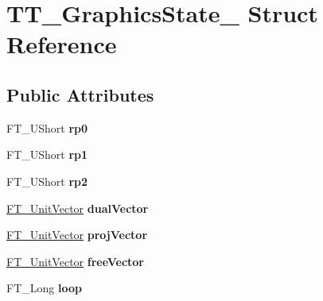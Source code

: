 \hypertarget{struct_t_t___graphics_state__}{}\section{T\+T\+\_\+\+Graphics\+State\+\_\+ Struct Reference}
\label{struct_t_t___graphics_state__}
\subsection*{Public Attributes}
\begin{DoxyCompactItemize}
\item 
\mbox{\label{struct_t_t___graphics_state___a359caf59279b2cc988d44266a3c44b48}} 
F\+T\+\_\+\+U\+Short {\bfseries rp0}
\item 
\mbox{\label{struct_t_t___graphics_state___ade72a46374f8869d16c8f7a8952c1d7f}} 
F\+T\+\_\+\+U\+Short {\bfseries rp1}
\item 
\mbox{\label{struct_t_t___graphics_state___aa93f489406aad906a6880dd66dbf3759}} 
F\+T\+\_\+\+U\+Short {\bfseries rp2}
\item 
\mbox{\label{struct_t_t___graphics_state___a5156622560c7aeb8c54c302c78d1e4b8}} 
\hyperlink{struct_f_t___unit_vector__}{F\+T\+\_\+\+Unit\+Vector} {\bfseries dual\+Vector}
\item 
\mbox{\label{struct_t_t___graphics_state___a928722018ef742cfaf938f20046e6e50}} 
\hyperlink{struct_f_t___unit_vector__}{F\+T\+\_\+\+Unit\+Vector} {\bfseries proj\+Vector}
\item 
\mbox{\label{struct_t_t___graphics_state___a842ea285523323ffa1c25a1f477faf27}} 
\hyperlink{struct_f_t___unit_vector__}{F\+T\+\_\+\+Unit\+Vector} {\bfseries free\+Vector}
\item 
\mbox{\label{struct_t_t___graphics_state___aae24068c1fde707ce490a4cfde3ca2cf}} 
F\+T\+\_\+\+Long {\bfseries loop}
\item 
\mbox{\label{struct_t_t___graphics_state___ad51b94592475dbbf28572af77239170f}} 

\end{DoxyCompactItemize}
